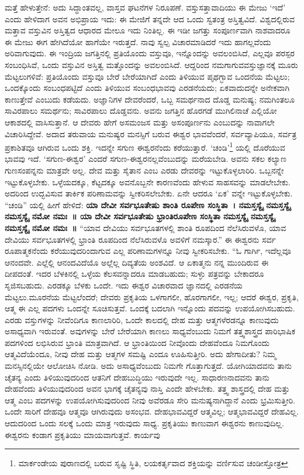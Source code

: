 ಮತ್ತೆ ಹೇಳುತ್ತೇನೆ: ಅದು ಸಿದ್ಧಾಂತವಲ್ಲ, ವಾಸ್ತವ ಘಟನೆಗಳ ನಿರೂಪಣೆ. ವಸ್ತುಸತ್ತಾವಾದಿಯು  ಈ ಮೇಜು ‘ಇದೆ’ ಎಂದು ಹೇಳಿದಾಗ ಅವನ ಅಭಿಪ್ರಾಯ ಇದು: ಈ ಮೇಜಿಗೆ ತನ್ನದೇ ಆದ ಒಂದು ಸ್ವತಂತ್ರ ಅಸ್ತಿತ್ವವಿದೆ. ವಿಶ್ವದಲ್ಲಿರುವ ಮತ್ತಾವ ವಸ್ತುವಿನ ಅಸ್ತಿತ್ವದ ಆಧಾರದ ಮೇಲೂ ಇದು ನಿಂತಿಲ್ಲ. ಈ ಇಡೀ ಜಗತ್ತು ಸಂಪೂರ್ಣವಾಗಿ ನಾಶವಾದರೂ ಈ ಮೇಜು ಈಗ ಹೇಗಿದೆಯೋ ಹಾಗೆಯೇ ಇರುತ್ತದೆ. ನಾವು ಸ್ವಲ್ಪ ವಿಚಾರಮಾಡಿದರೆ ಇದು ಹಾಗಲ್ಲವೆಂದು ಅರಿವಾಗುವುದು. ಈ ಇಂದ್ರಿಯ ಜಗತ್ತಿನಲ್ಲಿ ಪ್ರತಿಯೊಂದು ವಸ್ತುವೂ, ಇನ್ನೊಂದನ್ನು ಅವಲಂಬಿಸಿದೆ, ಎಲ್ಲವೂ ಪರಸ್ಪರ ಸಂಬಂಧಿಸಿವೆ, ಒಂದು ವಸ್ತುವಿನ ಅಸ್ತಿತ್ವ ಮತ್ತೊಂದನ್ನು ಅವಲಂಬಿಸಿದೆ. ಆದ್ದರಿಂದ ನಮಗಾಗುವ\break ವಸ್ತುಜ್ಞಾನಕ್ಕೆ ಮೂರು ಮೆಟ್ಟಲುಗಳಿವೆ: ಪ್ರತಿಯೊಂದು ವಸ್ತುವೂ ಬೇರೆ ಬೇರೆಯಾಗಿದೆ ಎಂದು ತಿಳಿಯುವ ಪೃಥಗ್ಭಾವ ಒಂದನೆಯ ಮೆಟ್ಟಲು; ಒಂದಕ್ಕೊಂದು ಸಂಬಂಧಪಟ್ಟಿದೆ ಎಂದು ತಿಳಿಯುವ ಸಂಬಂಧಭಾವವು ಎರಡನೆಯದು; ಏಕವಾದುದನ್ನೇ ಅನೇಕವಾಗಿ ಕಾಣುತ್ತೇವೆ ಎಂಬುದು ಕಡೆಯದು. ಅಜ್ಞಾನಿಗಳ ದೇವರೆಂದರೆ, ಒಬ್ಬ ಸಮರ್ಥನಾದ ದೊಡ್ಡ ಮನುಷ್ಯ; ನಮಗಿಂತಲೂ ಸಾವಿರಪಾಲು ಸಮರ್ಥನು; ಸಾವಿರಪಾಲು ದೊಡ್ಡವನು. ಅವನು ಜಗತ್ತಿನ ಹೊರಗಡೆ ಮುಗಿಲಿನಾಚೆ ಎಲ್ಲಿಯೋ ಆಕಾಶದಲ್ಲಿ ವಾಸಿಸುತ್ತಾನೆ. ಆ ದೇವರು ಹೇಗೆ ಅಸಮಂಜಸ ಮತ್ತು ಅಸಂಪೂರ್ಣನು ಎಂಬುದನ್ನು ನಾವಾಗಲೇ ವಿಚಾರಿಸಿದ್ದೇವೆ. ಅದಾದ ತರುವಾಯ ಮನುಷ್ಯರ ಮನಸ್ಸಿಗೆ ಬರುವ ಈಶ್ವರ ಭಾವವೆಂದರೆ, ಸರ್ವವ್ಯಾಪಿಯೂ, ಸರ್ವತ್ರ ಪ್ರಕಾಶಿತವೂ ಆಗಿರುವ ಒಂದು ಶಕ್ತಿ. ಇದನ್ನೇ ಸಗುಣ ಈಶ್ವರನೆಂದು ಕರೆಯುತ್ತಾರೆ. ‘ಚಂಡಿ’\footnote{ಮಾರ್ಕಂಡೇಯ ಪುರಾಣದಲ್ಲಿ ಬರುವ ಸೃಷ್ಟಿ ಸ್ಥಿತಿ, ಲಯಕರ್ತೃವಾದ ಶಕ್ತಿಯನ್ನು ವರ್ಣಿಸುವ ಚಂಡೀಸ್ತೋತ್ರ} ಯಲ್ಲಿ ದೊರೆಯುವ ಭಾವವು ಇದೆ. ‘ಸಗುಣ-ಈಶ್ವರ’ ಎಂದರೆ ಸಗುಣ-ಈಶ್ವರನಲ್ಲವೆಂಬುದನ್ನು ಮರೆಯಬೇಡಿ. ಅವನು ಸಕಲ ಕಲ್ಯಾಣ ಗುಣಸಂಪನ್ನನು ಮಾತ್ರವೇ ಅಲ್ಲ. ದೇವ ಮತ್ತು ಸೈತಾನ ಎಂಬ ಎರಡು ದೇವರನ್ನು ಇಟ್ಟುಕೊಳ್ಳಲಾರಿರಿ. ಒಬ್ಬನನ್ನೇ ಇಟ್ಟುಕೊಳ್ಳಬೇಕು. ಒಳ್ಳೆಯದಕ್ಕೂ, ಕೆಟ್ಟದಕ್ಕೂ ಅವನೊಬ್ಬನೇ ಕಾರಣವೆಂದು ಹೇಳುವ ಸಾಹಸವನ್ನು ಮಾಡಲೇಬೇಕು. ಅದರಿಂದ ಉದ್ಭವಿಸುವ ತಾರ್ಕಿಕ ಪರಿಣಾಮವನ್ನು ಸ್ವೀಕರಿಸಲೇಬೇಕು. ಏನೇ ಆದರೂ ‘ಏಕ’ ವನ್ನೇ ಇಟ್ಟುಕೊಳ್ಳಬೇಕು. “ಚಂಡಿ” ಯಲ್ಲಿ ಹೀಗೆ ಹೇಳಿದೆ: \textbf{ಯಾ ದೇವೀ ಸರ್ವ\-ಭೂತೇಷು ಶಾಂತಿ ರೂಪೇಣ ಸಂಸ್ಥಿತಾ~। ನಮಸ್ತಸ್ಯೈ ನಮಸ್ತಸ್ಯೈ ನಮಸ್ತಸ್ಯೈ ನಮೋ ನಮಃ~॥ ಯಾ ದೇವೀ ಸರ್ವಭೂತೇಷು ಭ್ರಾಂತಿರೂಪೇಣ ಸಂಸ್ಥಿತಾ ನಮಸ್ತಸ್ಯೈ ನಮಸ್ತಸ್ಯೈ ನಮಸ್ತಸ್ಯೈ ನಮೋ ನಮಃ~॥} “ಯಾವ ದೇವಿಯು ಸರ್ವಭೂತಗಳಲ್ಲಿ ಶಾಂತಿ ರೂಪದಿಂದ ನೆಲೆಸಿರುವಳೊ, ಯಾವ ದೇವಿಯು ಸರ್ವಭೂತಗಳಲ್ಲಿ ಭ್ರಾಂತಿ ರೂಪದಿಂದ ನೆಲೆಸಿರುವಳೊ ಅವಳಿಗೆ ನಮಸ್ಕಾರ.” ಈ ಈಶ್ವರನು ಸರ್ವ ರೂಪಾತ್ಮಕನೆಂದು ಕರೆಯುವುದರಿಂದಾಗುವ ಎಲ್ಲ ಪರಿಣಾಮಗಳನ್ನೂ ನೀವು ಸ್ವೀಕರಿಸಬೇಕು. “ಓ ಗಾರ್ಗಿ, ಇದೆಲ್ಲವೂ ಆನಂದವೇ. ಎಲ್ಲೆಲ್ಲಿ ಆನಂದವಿದೆಯೊ ಅಲ್ಲೆಲ್ಲ ದಿವ್ಯತೆಯ ಅಂಶವಿದೆ. ಆ ಏಕಾತ್ಮನು ನನ್ನ ಮುಂದಿರುವ ಈ ದೀಪದಂತೆ. ಇದರ ಬೆಳಕಿನಲ್ಲಿ ಒಳ್ಳೆಯ ಕೆಲಸವನ್ನಾದರೂ ಮಾಡಬಹುದು; ಸುಳ್ಳು ಪತ್ರವನ್ನು ಬೇಕಾದರೂ ಸೃಜಿಸಬಹುದು. ಎರಡಕ್ಕೂ ಬೆಳಕು ಒಂದೇ. ಇದು ಈಶ್ವರ ವಿಚಾರವಾದ ಜ್ಞಾನದಲ್ಲಿ ಎರಡನೆಯ ಮೆಟ್ಟಲು.\break ಮೂರನೆಯ ಮೆಟ್ಟಲೆಂದರೆ; ದೇವರು ಪ್ರಕೃತಿಯ ಒಳಗಾಗಲೀ, ಹೊರ\-ಗಾಗಲೀ, ಇಲ್ಲ; ಆದರೆ ಈಶ್ವರ, ಪ್ರಕೃತಿ, ಆತ್ಮ ಈ ಎಲ್ಲ ಪದಗಳು ಒಂದನ್ನೇ\- ಸೂಚಿಸುತ್ತವೆ. ಒಂದಕ್ಕೆ ಬದಲಾಗಿ ಇನ್ನೊಂದು ಪದವನ್ನು ಉಪಯೋಗಿಸಬಹುದು. ಎರಡು ವಸ್ತುಗಳನ್ನು ನೀವೆಂದಿಗೂ ಕಾಣಲಾರಿರಿ, ಒಂದೇ ಕಾಲದಲ್ಲಿ ದೇಹ ಮತ್ತು ಆತ್ಮಗಳೆರಡನ್ನೂ ಕಾಣುವುದು ಅಸಾಧ್ಯವಾಗಿ ಇರುವಂತೆ. ಅವುಗಳನ್ನು ಬೇರೆ ಬೇರೆಯಾಗಿ ಕಾಣಲು ಸಾಧ್ಯವೆಂಬುದು ನಿಮಗೆ ತತ್ತ್ವಶಾಸ್ತ್ರದ ಪಾರಿಭಾಷಿಕ ಪದಗಳಿಂದ ಲಭಿಸಿರುವ ಭ್ರಾಂತಿ ಮಾತ್ರವಾಗಿದೆ. ಆ ಭ್ರಾಂತಿಯಿಂದ ನೀವೊಂದು ದೇಹವೆಂದೂ ನಿಮಗೊಂದು ಆತ್ಮವಿದೆಯೆಂದೂ, ನೀವು ದೇಹ ಮತ್ತು ಆತ್ಮಗಳ ಸಮಷ್ಟಿ ಎಂದೂ ಊಹಿಸುತ್ತೀರಿ. ಅದು ಹೇಗಾದೀತು? ನಿಮ್ಮ ಮನಸ್ಸಿನಲ್ಲಿಯೇ ಆಲೋಚಿಸಿ ನೋಡಿ. ಅದು ಅಸಾಧ್ಯವೆಂಬುದು ನಿಮಗೇ ಗೊತ್ತಾಗುತ್ತದೆ. ಯೋಗಿಯಾದವನು ತಾನು ಚೈತನ್ಯ ಎಂದು ತಿಳಿಯುವುದರಿಂದ ಆತನಿಗೆ ದೇಹಬುದ್ಧಿಯು ಇರುವುದೇ ಇಲ್ಲ. ಸಾಧಾರಣನಾದವನು ತಾನು ದೇಹವೆಂದು ತಿಳಿಯುವುದರಿಂದ ಅವನ ಭಾಗಕ್ಕೆ ಚೈತನ್ಯವು ನಾಸ್ತಿ ಎಂದೇ ಹೇಳಬೇಕು. ತತ್ತ್ವ ಶಾಸ್ತ್ರದಲ್ಲಿ ದೇಹ ಮತ್ತು ಆತ್ಮ ಎಂಬ ಪದಗಳನ್ನು ಉಪಯೋಗಿಸುವುದರಿಂದ ನೀವು ಅವೆರಡೂ ಸೇರಿ ಮನುಷ್ಯನಾಗಿದ್ದಾನೆ ಎಂದು ಭ್ರಮಿಸುತ್ತೀರಿ. ಒಂದೇ ಸಾರಿಗೆ ದೇಹವೂ ಆತ್ಮವೂ ಆಗಿರುವುದು ಅಸಂಭವ. ದೇಹಭಾವವಿದ್ದರೆ ಆತ್ಮವಿಲ್ಲ; ಆತ್ಮಭಾವವಿದ್ದರೆ ದೇಹವಿಲ್ಲ. ಆದುದರಿಂದ ಒಂದು ಸಲಕ್ಕೆ ಒಂದು ಮಾತ್ರ ಇರುವುದು ಸಾಧ್ಯ. ಪ್ರಕೃತಿಯು ಕಾಣುವಾಗ ಈಶ್ವರನು ಕಾಣುವುದಿಲ್ಲ. ಈಶ್ವರನು ಕಂಡಾಗ ಪ್ರಕೃತಿಯು ಮಾಯವಾಗುತ್ತವೆ. ಕಾರ್ಯವು 